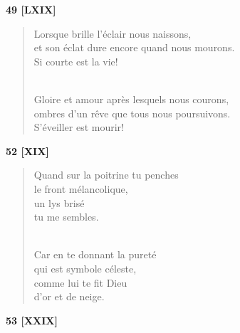 \documentclass[a4paper,12pt]{book}
\begin{document}
\bigskip

\begin{center} {\bf 49 [LXIX]} \end{center}

\begin{verse}
Lorsque brille l'éclair nous naissons, \\
et son éclat dure encore quand nous mourons. \\
Si courte est la vie! \\ \

Gloire et amour après lesquels nous courons, \\
ombres d'un rêve que tous nous poursuivons. \\
S'éveiller est mourir! \\
\end{verse}

\bigskip

\begin{center} {\bf 52 [XIX]} \end{center}

\begin{verse}
Quand sur la poitrine tu penches \\
le front mélancolique, \\
un lys brisé \\
tu me sembles. \\ \

Car en te donnant la pureté \\
qui est symbole céleste, \\
comme lui te fit Dieu \\
d'or et de neige. \\
\end{verse}


\begin{center} {\bf 53 [XXIX]} \end{center}
\end{document}
